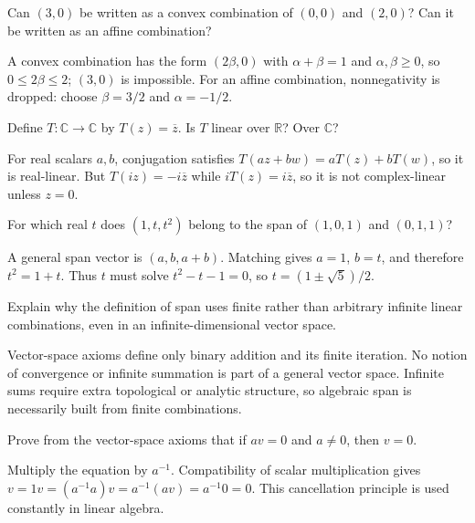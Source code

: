 \begin{problem}\label{prob:i01-problem-07}
Can $(3,0)$ be written as a convex combination of $(0,0)$ and $(2,0)$? Can it be written as an affine combination?
\end{problem}
\begin{solution}
A convex combination has the form $(2\beta,0)$ with $\alpha+\beta=1$ and $\alpha,\beta\ge0$, so $0\le2\beta\le2$; $(3,0)$ is impossible. For an affine combination, nonnegativity is dropped: choose $\beta=3/2$ and $\alpha=-1/2$.
\end{solution}

\begin{problem}\label{prob:i01-problem-08}
Define $T:\mathbb C\to\mathbb C$ by $T(z)=\overline z$. Is $T$ linear over $\mathbb R$? Over $\mathbb C$?
\end{problem}
\begin{solution}
For real scalars $a,b$, conjugation satisfies $T(az+bw)=aT(z)+bT(w)$, so it is real-linear. But $T(iz)=-i\overline z$ while $iT(z)=i\overline z$, so it is not complex-linear unless $z=0$.
\end{solution}

\begin{problem}\label{prob:i01-problem-09}
For which real $t$ does $(1,t,t^2)$ belong to the span of $(1,0,1)$ and $(0,1,1)$?
\end{problem}
\begin{solution}
A general span vector is $(a,b,a+b)$. Matching gives $a=1$, $b=t$, and therefore $t^2=1+t$. Thus $t$ must solve $t^2-t-1=0$, so $t=(1\pm\sqrt5)/2$.
\end{solution}

\begin{problem}\label{prob:i01-problem-10}
Explain why the definition of span uses finite rather than arbitrary infinite linear combinations, even in an infinite-dimensional vector space.
\end{problem}
\begin{solution}
Vector-space axioms define only binary addition and its finite iteration. No notion of convergence or infinite summation is part of a general vector space. Infinite sums require extra topological or analytic structure, so algebraic span is necessarily built from finite combinations.
\end{solution}

\begin{problem}\label{prob:i01-problem-11}
Prove from the vector-space axioms that if $av=0$ and $a\ne0$, then $v=0$.
\end{problem}
\begin{solution}
Multiply the equation by $a^{-1}$. Compatibility of scalar multiplication gives $v=1v=(a^{-1}a)v=a^{-1}(av)=a^{-1}0=0$. This cancellation principle is used constantly in linear algebra.
\end{solution}

